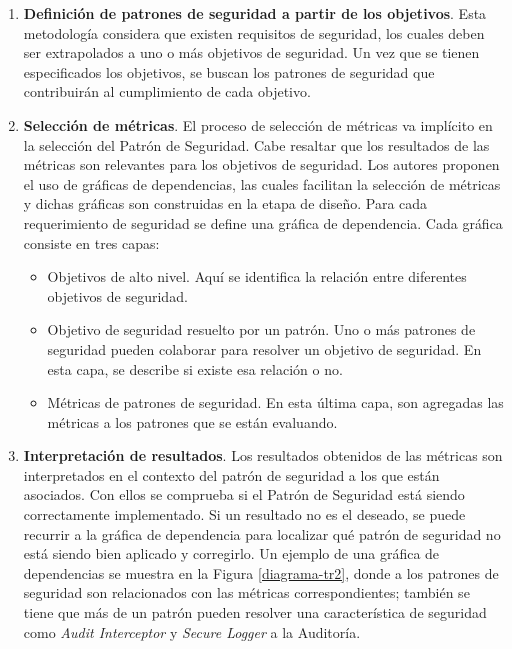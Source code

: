 \begin{enumerate}[noitemsep]
	\item \textbf{Definición de patrones de seguridad a partir de los objetivos}. Esta metodología considera que existen requisitos de seguridad, los cuales deben ser extrapolados a uno o más objetivos de seguridad. Un vez que se tienen especificados los objetivos, se buscan los patrones de seguridad que contribuirán al cumplimiento de cada objetivo. 
	\item \textbf{Selección de métricas}. El proceso de selección de métricas va implícito en la selección del Patrón de Seguridad. Cabe resaltar que los resultados de las métricas son relevantes para los objetivos de seguridad. Los autores proponen el uso de gráficas de dependencias, las cuales facilitan la selección de métricas y dichas gráficas son construidas en la etapa de diseño. Para cada requerimiento de seguridad se define una gráfica de dependencia. Cada gráfica consiste en tres capas:
\begin{itemize}[noitemsep]
	\item Objetivos de alto nivel. Aquí se identifica la relación entre diferentes objetivos de seguridad. 
	\item Objetivo de seguridad resuelto por un patrón. Uno o más patrones de seguridad pueden colaborar para resolver un objetivo de seguridad. En esta capa, se describe si existe esa relación o no. 
	\item Métricas de patrones de seguridad. En esta última capa, son agregadas las métricas a los patrones que se están evaluando.
\end{itemize}
	\item \textbf{Interpretación de resultados}. Los resultados obtenidos de las métricas son interpretados en el contexto del patrón de seguridad a los que están asociados. Con ellos se comprueba si el Patrón de Seguridad está siendo correctamente implementado. Si un resultado no es el deseado, se puede recurrir a la gráfica de dependencia para localizar qué patrón de seguridad no está siendo bien aplicado y corregirlo. Un ejemplo de una gráfica de dependencias se muestra en la Figura \ref{diagrama-tr2}, donde a los patrones de seguridad son relacionados con las métricas correspondientes; también se tiene que más de un patrón pueden resolver una característica de seguridad como \textit{Audit Interceptor} y \textit{Secure Logger} a la Auditoría.
\end{enumerate}
%
